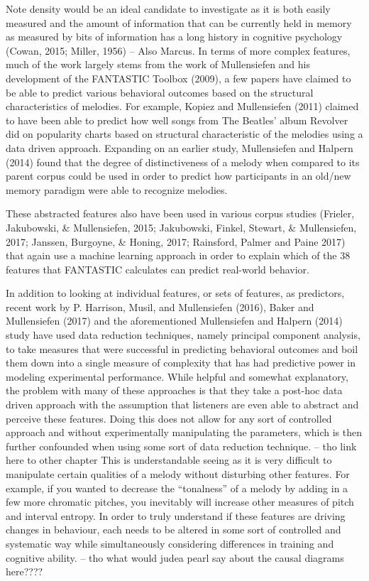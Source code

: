 \documentclass[]{book}
\begin{document}
Note density would be an ideal candidate to investigate as it is both easily measured and the amount of
information that can be currently held in memory as measured by bits of information has a long history in cognitive psychology (Cowan, 2015; Miller, 1956) -- Also Marcus.
In terms of more complex features, much of the work largely stems from the work of Mullensiefen and his development of the FANTASTIC Toolbox (2009), a few papers have claimed to be able to predict various behavioral outcomes based on the structural characteristics of melodies.
For example, Kopiez and Mullensiefen (2011) claimed to have been able to predict how well songs from The Beatles' album Revolver did on popularity charts based on structural characteristic of the melodies using a data driven approach.
Expanding on an earlier study, Mullensiefen and Halpern (2014) found that the degree of distinctiveness of a melody when compared to its parent corpus could be used in order to predict how participants in an old/new memory paradigm were able to recognize melodies.

These abstracted features also have been used in various corpus studies (Frieler, Jakubowski, \& Mullensiefen, 2015; Jakubowski, Finkel, Stewart, \& Mullensiefen, 2017; Janssen, Burgoyne, \& Honing, 2017; Rainsford, Palmer and Paine 2017) that again use a machine learning approach in order to explain which of the 38 features that FANTASTIC calculates can predict real-world behavior.

In addition to looking at individual features, or sets of features, as predictors, recent work by P. Harrison, Musil, and Mullensiefen (2016), Baker and Mullensiefen (2017) and the aforementioned Mullensiefen and Halpern (2014) study have used data
reduction techniques, namely principal component analysis, to take measures that were successful in predicting behavioral outcomes and boil them down into a single measure of complexity that has had predictive power in modeling experimental performance.
While helpful and somewhat explanatory, the problem with many of these approaches is that they take a post-hoc data driven approach with the assumption that listeners are even able to abstract and perceive these features.
Doing this does not allow for any sort of controlled approach and without experimentally manipulating the parameters, which is then further confounded when using some sort of data reduction technique. -- tho link here to other chapter
This is understandable seeing as it is very difficult to manipulate certain qualities of a melody without disturbing
other features.
For example, if you wanted to decrease the ``tonalness'' of a melody by adding in a few more chromatic pitches, you inevitably will increase other measures of pitch and interval entropy.
In order to truly understand if these features are driving changes in behaviour, each needs to be altered in some sort of controlled and systematic way while simultaneously considering differences in training and cognitive ability. -- tho what would judea pearl say about the causal diagrams here????
\end{document}
